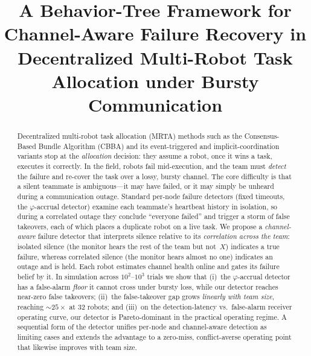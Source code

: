 \documentclass[conference]{IEEEtran}
\begin{document}
\title{A Behavior-Tree Framework for Channel-Aware Failure Recovery in\\
Decentralized Multi-Robot Task Allocation under Bursty Communication}

\author{
}

\maketitle

\begin{abstract}
Decentralized multi-robot task allocation (MRTA) methods such as the
Consensus-Based Bundle Algorithm (CBBA) and its event-triggered and
implicit-coordination variants stop at the \emph{allocation} decision: they
assume a robot, once it wins a task, executes it correctly. In the field,
robots fail mid-execution, and the team must \emph{detect} the failure and
re-cover the task over a lossy, bursty channel. The core difficulty is that a
silent teammate is ambiguous---it may have failed, or it may simply be
unheard during a communication outage. Standard per-node failure detectors
(fixed timeouts, the $\varphi$-accrual detector) examine each teammate's
heartbeat history in isolation, so during a correlated outage they conclude
``everyone failed'' and trigger a storm of false takeovers, each of which
places a duplicate robot on a live task. We propose a \emph{channel-aware}
failure detector that interprets silence relative to its \emph{correlation
across the team}: isolated silence (the monitor hears the rest of the team but
not~$X$) indicates a true failure, whereas correlated silence (the monitor
hears almost no one) indicates an outage and is held. Each robot estimates
channel health online and gates its failure belief by it. In simulation across
$10^{2}$--$10^{3}$ trials we show that (i)~the $\varphi$-accrual detector has a
false-alarm \emph{floor} it cannot cross under bursty loss, while our detector
reaches near-zero false takeovers; (ii)~the false-takeover gap grows
\emph{linearly with team size}, reaching $\sim$$25\times$ at $32$ robots; and
(iii)~on the detection-latency vs.\ false-alarm receiver operating curve, our
detector is Pareto-dominant in the practical operating regime. A sequential form
of the detector unifies per-node and channel-aware detection as limiting cases
and extends the advantage to a zero-miss, conflict-averse operating point that
likewise improves with team size.
\end{abstract}
\end{document}
